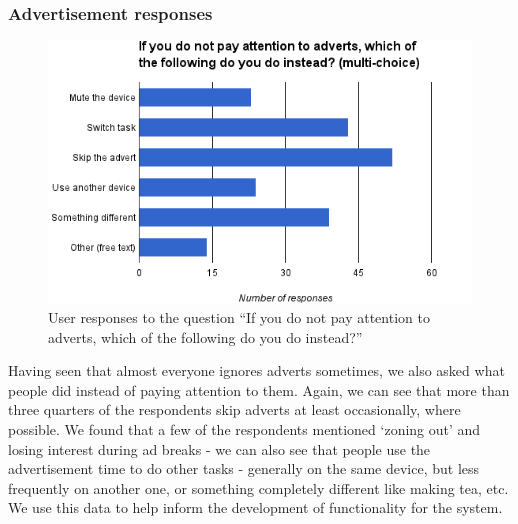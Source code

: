\subsubsection{Advertisement responses}
\label{sec:prestudy_alternatives}
\begin{figure}[H]
	\vspace{-10pt}
	\includegraphics[width=\textwidth, clip=true, trim=0 0 0 50pt]{images/prestudy_alternatives.png}
	\caption{User responses to the question ``If you do not pay attention to adverts, which of the following do you do instead?''}
	\label{fig:prestudy_alternatives}
	\vspace{-15pt}
\end{figure}
Having seen that almost everyone ignores adverts sometimes, we also asked what people did instead of paying attention to them. Again, we can see that more than three quarters of the respondents skip adverts at least occasionally, where possible. We found that a few of the respondents mentioned `zoning out' and losing interest during ad breaks - we can also see that people use the advertisement time to do other tasks - generally on the same device, but less frequently on another one, or something completely different like making tea, etc. We use this data to help inform the development of functionality for the system.
